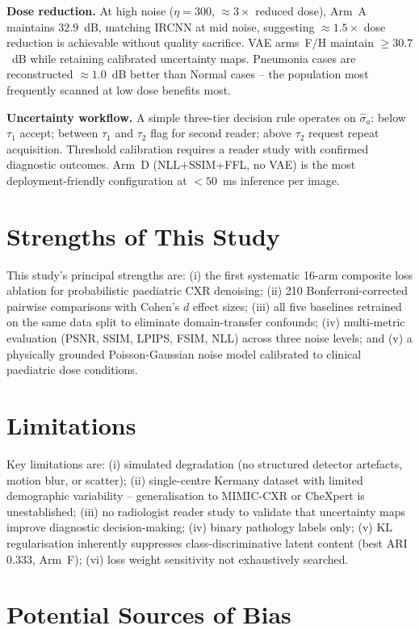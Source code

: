 \documentclass[12pt, a4paper, twoside, openright]{book}
\begin{document}
\textbf{Dose reduction.} At high noise ($\eta=300$, $\approx 3\times$ reduced dose), Arm~A maintains $32.9$~dB, matching IRCNN at mid noise, suggesting $\approx1.5\times$ dose reduction is achievable without quality sacrifice. VAE arms~F/H maintain $\geq 30.7$~dB while retaining calibrated uncertainty maps. Pneumonia cases are reconstructed $\approx 1.0$~dB better than Normal cases -- the population most frequently scanned at low dose benefits most.

\textbf{Uncertainty workflow.} A simple three-tier decision rule operates on $\hat{\sigma}_a$: below $\tau_1$ accept; between $\tau_1$ and $\tau_2$ flag for second reader; above $\tau_2$ request repeat acquisition. Threshold calibration requires a reader study with confirmed diagnostic outcomes. Arm~D (NLL+SSIM+FFL, no VAE) is the most deployment-friendly configuration at $<50$~ms inference per image.

\section{Strengths of This Study}
\label{sec:disc:strengths}

This study's principal strengths are: (i) the first systematic 16-arm composite loss ablation for probabilistic paediatric CXR denoising; (ii) 210 Bonferroni-corrected pairwise comparisons with Cohen's $d$ effect sizes; (iii) all five baselines retrained on the same data split to eliminate domain-transfer confounds; (iv) multi-metric evaluation (PSNR, SSIM, LPIPS, FSIM, NLL) across three noise levels; and (v) a physically grounded Poisson-Gaussian noise model calibrated to clinical paediatric dose conditions.

\section{Limitations}
\label{sec:disc:limitations}

Key limitations are: (i) simulated degradation (no structured detector artefacts, motion blur, or scatter); (ii) single-centre Kermany dataset with limited demographic variability -- generalisation to MIMIC-CXR or CheXpert is unestablished; (iii) no radiologist reader study to validate that uncertainty maps improve diagnostic decision-making; (iv) binary pathology labels only; (v) KL regularisation inherently suppresses class-discriminative latent content (best ARI~$0.333$, Arm~F); (vi) loss weight sensitivity not exhaustively searched.

\section{Potential Sources of Bias}
\label{sec:disc:bias}
\end{document}
